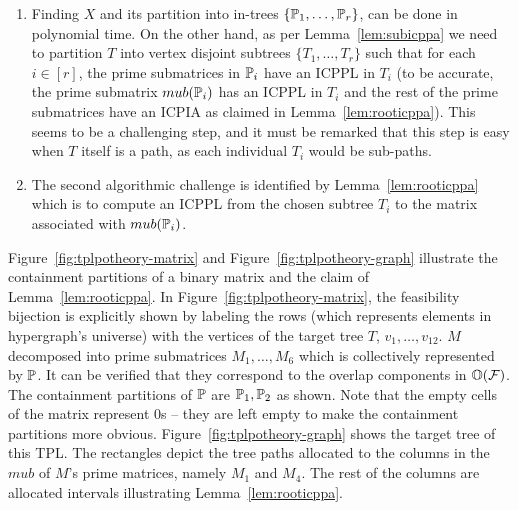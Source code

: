 \begin{enumerate}
\item \label{it:challenge1} Finding $X$ and its partition into in-trees
  $\{\mathbb P_1,\ldots,\mathbb P_r\}$, can be done in polynomial time.  On the
  other hand, as per Lemma~\ref{lem:subicppa} we need to partition $T$
  into vertex disjoint subtrees $\{T_1, \ldots, T_r\}$ such that for
  each $i \in [r]$, the prime submatrices in $\mathbb P_i$ have an ICPPL in
  $T_i$ (to be accurate, the prime submatrix $mub(\mathbb P_i)$ has an ICPPL
  in $T_i$ and the rest of the prime submatrices have an ICPIA as
  claimed in Lemma~\ref{lem:rooticppa}).  This seems to be a
  challenging step, and it must be remarked that this step is easy
  when $T$ itself is a path, as each individual $T_i$ would be
  sub-paths.
\item \label{it:challenge2} The second algorithmic challenge is identified by
  Lemma~\ref{lem:rooticppa} which is to compute an ICPPL from the
  chosen subtree $T_i$
  to the matrix associated with $mub(\mathbb P_i)$.
\end{enumerate}


Figure~\ref{fig:tplpotheory-matrix} and
Figure~\ref{fig:tplpotheory-graph} illustrate the containment
partitions of a binary matrix and the claim of
Lemma~\ref{lem:rooticppa}. In Figure~\ref{fig:tplpotheory-matrix}, the
feasibility bijection is explicitly shown by labeling the rows (which
represents elements in hypergraph's universe) with the vertices of the
target tree $T$, $v_1, \ldots, v_{12}$.  $M$ decomposed into prime
submatrices $M_1, \ldots, M_6$ which is collectively represented by
$\mathbb P$. It can be verified that they correspond to the overlap
components in $\mathbb O({\cal F})$. The containment partitions of $\mathbb P$ are
$\mathbb P_1, \mathbb P_2$ as shown. Note that the empty cells of the matrix
represent 0s -- they are left empty to make the containment partitions
more obvious.  Figure~\ref{fig:tplpotheory-graph} shows the target
tree of this TPL. The rectangles depict the tree paths allocated to
the columns in the $mub$ of $M$'s prime matrices, namely $M_1$ and
$M_4$. The rest of the columns are allocated intervals illustrating
Lemma~\ref{lem:rooticppa}.  

